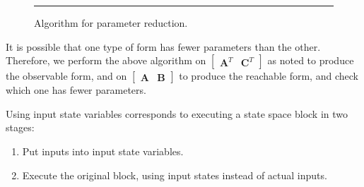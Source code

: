 \begin{figure}[t]
\begin{singlespace}
{%







\vspace{-18pt}}
\caption{Algorithm for parameter reduction. \protect\label{fig:param}}
\vspace{6pt}
\hrule
\vspace{6pt}
\end{singlespace}
\end{figure}

    It is possible that one type of form has fewer parameters than the
other. Therefore, we perform the above algorithm on $\left [
\begin{array} {cc} \mathbf{A}^T & \mathbf{C}^T
\end{array} \right ]$ as noted to produce the observable form, and on $\left [
\begin{array} {cc} \mathbf{A} & \mathbf{B} \end{array} \right
]$ to produce the reachable form, and check which one has fewer
parameters.


Using input state variables corresponds to executing a state space
block in two stages:
\begin{enumerate}
\vspace{\itemshrink} \item Put inputs into input state variables.

\vspace{\itemshrink} \item Execute the original block, using input states instead of
actual inputs.
\vspace{\itemshrink} \end{enumerate}

